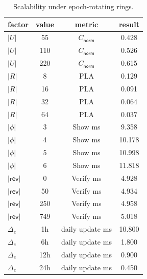 \begin{table}[htbp]
\centering
\caption{Scalability under epoch-rotating rings.}
\label{tab:scalability}
\begin{tabular}{@{}lccc@{}}
\toprule
factor & value & metric & result \\
\midrule
$|U|$ & 55 & $C_{\mathsf{norm}}$ & 0.428 \\
$|U|$ & 110 & $C_{\mathsf{norm}}$ & 0.526 \\
$|U|$ & 220 & $C_{\mathsf{norm}}$ & 0.615 \\
$|R|$ & 8 & PLA & 0.129 \\
$|R|$ & 16 & PLA & 0.091 \\
$|R|$ & 32 & PLA & 0.064 \\
$|R|$ & 64 & PLA & 0.037 \\
$|\phi|$ & 3 & Show ms & 9.358 \\
$|\phi|$ & 4 & Show ms & 10.178 \\
$|\phi|$ & 5 & Show ms & 10.998 \\
$|\phi|$ & 6 & Show ms & 11.818 \\
$|\mathsf{rev}|$ & 0 & Verify ms & 4.928 \\
$|\mathsf{rev}|$ & 50 & Verify ms & 4.934 \\
$|\mathsf{rev}|$ & 250 & Verify ms & 4.958 \\
$|\mathsf{rev}|$ & 749 & Verify ms & 5.018 \\
$\Delta_e$ & 1h & daily update ms & 10.800 \\
$\Delta_e$ & 6h & daily update ms & 1.800 \\
$\Delta_e$ & 12h & daily update ms & 0.900 \\
$\Delta_e$ & 24h & daily update ms & 0.450 \\
\bottomrule
\end{tabular}
\end{table}
